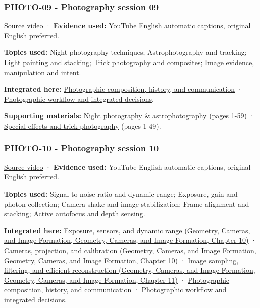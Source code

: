 \subsubsection{PHOTO-09 - Photography session 09}\label{04-visual-computing-ii-ch036-photo-09---photography-session-09}

\href{https://www.youtube.com/watch?v=1ah8EEqfFsM}{Source video} · \textbf{Evidence used:} YouTube English automatic captions, original English preferred.

\textbf{Topics used:} Night photography techniques; Astrophotography and tracking; Light painting and stacking; Trick photography and composites; Image evidence, manipulation and intent.

\textbf{Integrated here:} \hyperref[04-visual-computing-ii-ch034-photographic-composition-history-and-communication]{Photographic composition, history, and communication} · \hyperref[04-visual-computing-ii-ch034-photographic-workflow-and-integrated-decisions]{Photographic workflow and integrated decisions}.

\textbf{Supporting materials:} \href{https://drive.google.com/open?id=0B6w2XfPHEcZYaTJ5M2RhZzBwWTg}{Night photography \& astrophotography} (pages 1-59) · \href{https://drive.google.com/open?id=0B6w2XfPHEcZYdklBY3BfVTFSSnM}{Special effects and trick photography} (pages 1-49).

\subsubsection{PHOTO-10 - Photography session 10}\label{04-visual-computing-ii-ch036-photo-10---photography-session-10}

\href{https://www.youtube.com/watch?v=ia9w4ZtdULs}{Source video} · \textbf{Evidence used:} YouTube English automatic captions, original English preferred.

\textbf{Topics used:} Signal-to-noise ratio and dynamic range; Exposure, gain and photon collection; Camera shake and image stabilization; Frame alignment and stacking; Active autofocus and depth sensing.

\textbf{Integrated here:} \href{../03-Geometry-Cameras-and-Image-Formation/main.pdf\#nameddest=03-visual-computing-i-ch003-exposure-sensors-and-dynamic-range}{Exposure, sensors, and dynamic range (Geometry, Cameras, and Image Formation, Geometry, Cameras, and Image Formation, Chapter 10)} · \href{../03-Geometry-Cameras-and-Image-Formation/main.pdf\#nameddest=03-visual-computing-i-ch003-cameras-projection-and-calibration}{Cameras, projection, and calibration (Geometry, Cameras, and Image Formation, Geometry, Cameras, and Image Formation, Chapter 10)} · \href{../03-Geometry-Cameras-and-Image-Formation/main.pdf\#nameddest=03-visual-computing-i-ch004-image-sampling-filtering-and-efficient-reconstruction}{Image sampling, filtering, and efficient reconstruction (Geometry, Cameras, and Image Formation, Geometry, Cameras, and Image Formation, Chapter 11)} · \hyperref[04-visual-computing-ii-ch034-photographic-composition-history-and-communication]{Photographic composition, history, and communication} · \hyperref[04-visual-computing-ii-ch034-photographic-workflow-and-integrated-decisions]{Photographic workflow and integrated decisions}.

